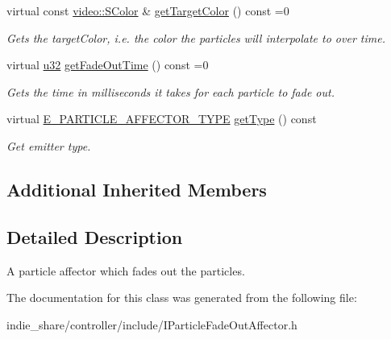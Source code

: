 \begin{DoxyCompactItemize}
\mbox{\label{classirr_1_1scene_1_1IParticleFadeOutAffector_a85301f6c37546e881ffa354a67d673ed}} 
virtual const \hyperlink{classirr_1_1video_1_1SColor}{video\+::\+S\+Color} \& \hyperlink{classirr_1_1scene_1_1IParticleFadeOutAffector_a85301f6c37546e881ffa354a67d673ed}{get\+Target\+Color} () const =0
\begin{DoxyCompactList}\small\item\em Gets the target\+Color, i.\+e. the color the particles will interpolate to over time. \end{DoxyCompactList}\item 
\mbox{\label{classirr_1_1scene_1_1IParticleFadeOutAffector_a4c4195b7878fd93526506e1c592bdbec}} 
virtual \hyperlink{namespaceirr_a0416a53257075833e7002efd0a18e804}{u32} \hyperlink{classirr_1_1scene_1_1IParticleFadeOutAffector_a4c4195b7878fd93526506e1c592bdbec}{get\+Fade\+Out\+Time} () const =0
\begin{DoxyCompactList}\small\item\em Gets the time in milliseconds it takes for each particle to fade out. \end{DoxyCompactList}\item 
\mbox{\label{classirr_1_1scene_1_1IParticleFadeOutAffector_aaf584388aa7065bbfdb571253ba34b61}} 
virtual \hyperlink{namespaceirr_1_1scene_a34c0f9475cfcbda8b50ad816a046010b}{E\+\_\+\+P\+A\+R\+T\+I\+C\+L\+E\+\_\+\+A\+F\+F\+E\+C\+T\+O\+R\+\_\+\+T\+Y\+PE} \hyperlink{classirr_1_1scene_1_1IParticleFadeOutAffector_aaf584388aa7065bbfdb571253ba34b61}{get\+Type} () const
\begin{DoxyCompactList}\small\item\em Get emitter type. \end{DoxyCompactList}\end{DoxyCompactItemize}
\subsection*{Additional Inherited Members}


\subsection{Detailed Description}
A particle affector which fades out the particles. 

The documentation for this class was generated from the following file\+:\begin{DoxyCompactItemize}
\item 
indie\+\_\+share/controller/include/I\+Particle\+Fade\+Out\+Affector.\+h\end{DoxyCompactItemize}
